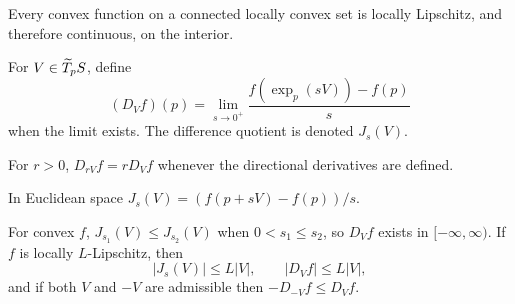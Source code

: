 \begin{lemma}
\label{lem:chow-iii-h21-convex-locally-lipschitz}

Every convex function on a connected locally convex set is locally Lipschitz, and
therefore continuous, on the interior.
\end{lemma}

\begin{definition}
\label{def:chow-iii-h22-directional-derivative}
For $V\in\widetilde T_pS$, define
\[
(D_Vf)(p)=\lim_{s\to0^+}\frac{f(\exp_p(sV))-f(p)}{s}
\]
when the limit exists.  The difference quotient is denoted $J_s(V)$.
\end{definition}

\begin{lemma}
\label{lem:chow-iii-h23-directional-homogeneity}

For $r>0$, $D_{rV}f=rD_Vf$ whenever the directional derivatives are defined.
\end{lemma}

\begin{remark}
\label{rem:chow-iii-h24-euclidean-difference-quotient}
In Euclidean space $J_s(V)=(f(p+sV)-f(p))/s$.
\end{remark}

\begin{lemma}
\label{lem:chow-iii-h25-directional-properties}

For convex $f$, $J_{s_1}(V)\le J_{s_2}(V)$ when $0<s_1\le s_2$, so $D_Vf$ exists
in $[-\infty,\infty)$.  If $f$ is locally $L$-Lipschitz, then
\[
|J_s(V)|\le L|V|,\qquad |D_Vf|\le L|V|,
\]
and if both $V$ and $-V$ are admissible then $-D_{-V}f\le D_Vf$.
\end{lemma}

